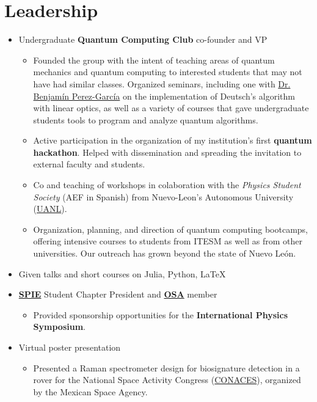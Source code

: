 \documentclass[a4paper,11pt,notitlepage]{article}
\begin{document}
\section{Leadership}
\begin{itemize}
\setlength{\itemsep}{0.7em}
\item Undergraduate \textbf{Quantum Computing Club} co-founder and VP
\begin{itemize}
\setlength{\itemsep}{0.7em}
\item Founded the group with the intent of teaching areas of quantum mechanics and quantum computing to interested students that may not have had similar classes. Organized seminars, including one with \href{https://scholar.google.co.za/citations?user=JudpAs4AAAAJ&hl=en}{Dr. Benjamín Perez-García} on the implementation of Deutsch's algorithm with linear optics, as well as a variety of courses that gave undergraduate students tools to program and analyze quantum algorithms.
\item Active participation in the organization of my institution's first \textbf{quantum hackathon}. Helped with dissemination and spreading the invitation to external faculty and students.
\item Co and teaching of workshops in colaboration with the \emph{Physics Student Society} (AEF in Spanish) from Nuevo-Leon's Autonomous University (\href{https://www.uanl.mx/en/}{UANL}).
\item Organization, planning, and direction of quantum computing bootcamps, offering intensive courses to students from ITESM as well as from other universities. Our outreach has grown beyond the state of Nuevo León.
\end{itemize}
        
\item Given talks and short courses on Julia, Python, \LaTeX {}
\item \href{https://spie.org}{\textbf{SPIE}} Student Chapter President and \href{https://www.optica.org/en-us/home/}{\textbf{OSA}} member 
\begin{itemize}
\item Provided sponsorship opportunities for the \textbf{International Physics Symposium}.
\end{itemize}
        
\item Virtual poster presentation 
\begin{itemize}
\item Presented a Raman spectrometer design for biosignature detection in a rover for the National Space Activity Congress (\href{https://haciaelespacio.aem.gob.mx/revistadigital/articul.php?interior=1176}{CONACES}), organized by the Mexican Space Agency.
\end{itemize}

\end{itemize}
\medskip
\end{document}
